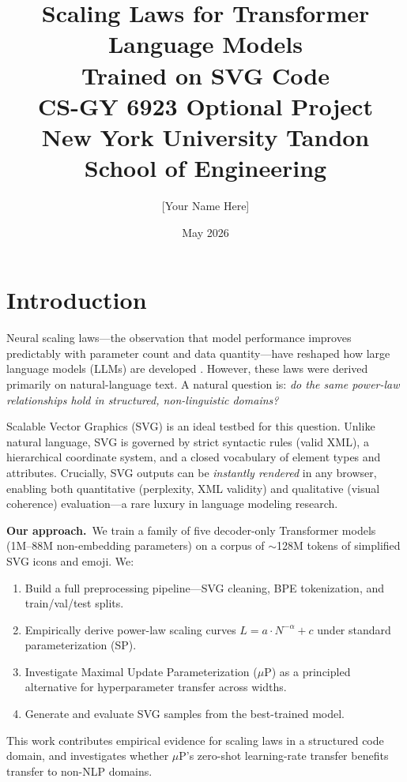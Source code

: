 \documentclass[11pt,letterpaper]{article}
\title{\textbf{Scaling Laws for Transformer Language Models\\Trained on SVG Code}\\[4pt]
\large CS-GY 6923 Optional Project\\
New York University Tandon School of Engineering}
\author{[Your Name Here]}
\date{May 2026}
\begin{document}
\maketitle
\tableofcontents
\newpage

\section{Introduction}

Neural scaling laws—the observation that model performance improves predictably with parameter
count and data quantity—have reshaped how large language models (LLMs) are developed
\cite{kaplan2020scaling,hoffmann2022chinchilla}. However, these laws were derived primarily on
natural-language text. A natural question is: \emph{do the same power-law relationships hold in
structured, non-linguistic domains?}

Scalable Vector Graphics (SVG) is an ideal testbed for this question. Unlike natural language,
SVG is governed by strict syntactic rules (valid XML), a hierarchical coordinate system, and
a closed vocabulary of element types and attributes. Crucially, SVG outputs can be
\emph{instantly rendered} in any browser, enabling both quantitative (perplexity, XML validity)
and qualitative (visual coherence) evaluation—a rare luxury in language modeling research.

\textbf{Our approach.}~We train a family of five decoder-only Transformer models (1M–88M
non-embedding parameters) on a corpus of $\sim$128M tokens of simplified SVG icons and emoji.
We:
\begin{enumerate}[nosep]
  \item Build a full preprocessing pipeline—SVG cleaning, BPE tokenization, and train/val/test splits.
  \item Empirically derive power-law scaling curves $L = a \cdot N^{-\alpha} + c$ under
        standard parameterization (SP).
  \item Investigate Maximal Update Parameterization ($\mu$P) as a principled alternative for
        hyperparameter transfer across widths.
  \item Generate and evaluate SVG samples from the best-trained model.
\end{enumerate}

This work contributes empirical evidence for scaling laws in a structured code domain, and
investigates whether $\mu$P's zero-shot learning-rate transfer benefits transfer to non-NLP
domains.
\end{document}
